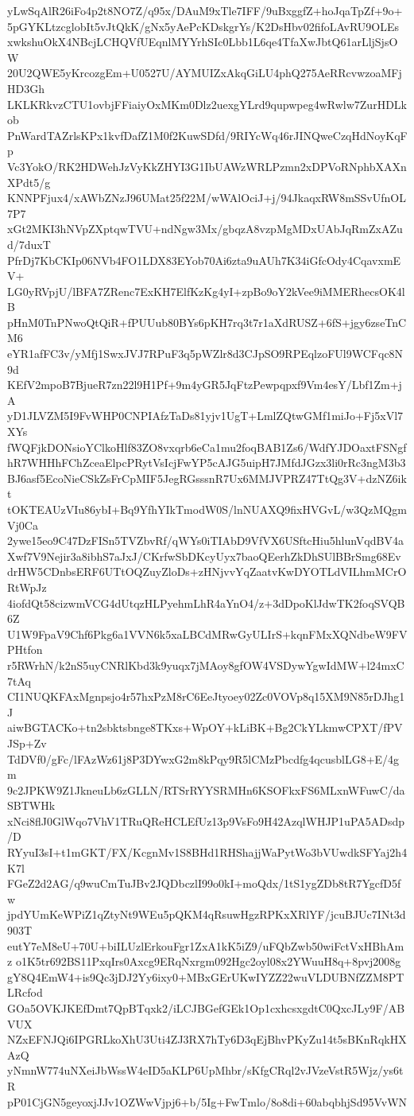 yLwSqAlR26iFo4p2t8NO7Z/q95x/DAuM9xTle7IFF/9uBxggfZ+hoJqaTpZf+9o+
5pGYKLtzcglobIt5vJtQkK/gNx5yAePcKDskgrYs/K2DsHbv02fifoLAvRU9OLEs
xwkshuOkX4NBcjLCHQVfUEqnlMYYrhSIc0Lbb1L6qe4TfaXwJbtQ61arLljSjsOW
20U2QWE5yKrcozgEm+U0527U/AYMUIZxAkqGiLU4phQ275AeRRcvwzoaMFjHD3Gh
LKLKRkvzCTU1ovbjFFiaiyOxMKm0Dlz2uexgYLrd9qupwpeg4wRwlw7ZurHDLkob
PnWardTAZrlsKPx1kvfDafZ1M0f2KuwSDfd/9RIYcWq46rJINQweCzqHdNoyKqFp
Vc3YokO/RK2HDWehJzVyKkZHYI3G1IbUAWzWRLPzmn2xDPVoRNphbXAXnXPdt5/g
KNNPFjux4/xAWbZNzJ96UMat25f22M/wWAlOciJ+j/94JkaqxRW8mSSvUfnOL7P7
xGt2MKI3hNVpZXptqwTVU+ndNgw3Mx/gbqzA8vzpMgMDxUAbJqRmZxAZud/7duxT
PfrDj7KbCKIp06NVb4FO1LDX83EYob70Ai6zta9uAUh7K34iGfcOdy4CqavxmEV+
LG0yRVpjU/lBFA7ZRenc7ExKH7ElfKzKg4yI+zpBo9oY2kVee9iMMERhecsOK4lB
pHnM0TnPNwoQtQiR+fPUUub80BYs6pKH7rq3t7r1aXdRUSZ+6fS+jgy6zseTnCM6
eYR1afFC3v/yMfj1SwxJVJ7RPuF3q5pWZlr8d3CJpSO9RPEqlzoFUl9WCFqc8N9d
KEfV2mpoB7BjueR7zn22l9H1Pf+9m4yGR5JqFtzPewpqpxf9Vm4esY/Lbf1Zm+jA
yD1JLVZM5I9FvWHP0CNPIAfzTaDs81yjv1UgT+LmlZQtwGMf1miJo+Fj5xVl7XYs
fWQFjkDONsioYClkoHlf83ZO8vxqrb6eCa1mu2foqBAB1Zs6/WdfYJDOaxtFSNgf
hR7WHHhFChZceaElpcPRytVsIcjFwYP5cAJG5uipH7JMfdJGzx3li0rRc3ngM3b3
BJ6asf5EcoNieCSkZsFrCpMIF5JegRGsssnR7Ux6MMJVPRZ47TtQg3V+dzNZ6ikt
tOKTEAUzVIu86ybI+Bq9YfhYIkTmodW0S/lnNUAXQ9fixHVGvL/w3QzMQgmVj0Ca
2ywe15eo9C47DzFISn5TVZbvRf/qWYs0iTIAbD9VfVX6USftcHiu5hlunVqdBV4a
Xwf7V9Nejir3a8ibhS7aJxJ/CKrfwSbDKcyUyx7baoQEerhZkDhSUlBBrSmg68Ev
drHW5CDnbsERF6UTtOQZuyZloDs+zHNjvvYqZaatvKwDYOTLdVILhmMCrORtWpJz
4iofdQt58cizwmVCG4dUtqzHLPyehmLhR4aYnO4/z+3dDpoKlJdwTK2foqSVQB6Z
U1W9FpaV9Chf6Pkg6a1VVN6k5xaLBCdMRwGyULIrS+kqnFMxXQNdbeW9FVPHtfon
r5RWrhN/k2nS5uyCNRlKbd3k9yuqx7jMAoy8gfOW4VSDywYgwIdMW+l24mxC7tAq
CI1NUQKFAxMgnpsjo4r57hxPzM8rC6EeJtyoey02Zc0VOVp8q15XM9N85rDJhg1J
aiwBGTACKo+tn2sbktsbnge8TKxs+WpOY+kLiBK+Bg2CkYLkmwCPXT/fPVJSp+Zv
TdDVf0/gFc/lFAzWz61j8P3DYwxG2m8kPqy9R5lCMzPbcdfg4qcusblLG8+E/4gm
9c2JPKW9Z1JkneuLb6zGLLN/RTSrRYYSRMHn6KSOFkxFS6MLxnWFuwC/daSBTWHk
xNci8flJ0GlWqo7VhV1TRuQReHCLEfUz13p9VsFo9H42AzqlWHJP1uPA5ADsdp/D
RYyuI3sI+t1mGKT/FX/KcgnMv1S8BHd1RHShajjWaPytWo3bVUwdkSFYaj2h4K7l
FGeZ2d2AG/q9wuCmTuJBv2JQDbczlI99o0kI+moQdx/1tS1ygZDb8tR7YgcfD5fw
jpdYUmKeWPiZ1qZtyNt9WEu5pQKM4qRsuwHgzRPKxXRlYF/jcuBJUc7INt3d903T
eutY7eM8eU+70U+biILUzlErkouFgr1ZxA1kK5iZ9/uFQbZwb50wiFctVxHBhAmz
o1K5tr692BS11PxqIrs0Axcg9ERqNxrgm092Hgc2oyl08x2YWuuH8q+8pvj2008g
gY8Q4EmW4+is9Qc3jDJ2Yy6ixy0+MBxGErUKwIYZZ22wuVLDUBNfZZM8PTLRcfod
GOa5OVKJKEfDmt7QpBTqxk2/iLCJBGefGEk1Op1cxhcsxgdtC0QxcJLy9F/ABVUX
NZxEFNJQi6IPGRLkoXhU3Uti4ZJ3RX7hTy6D3qEjBhvPKyZu14t5sBKnRqkHXAzQ
yNmnW774uNXeiJbWssW4eID5aKLP6UpMhbr/sKfgCRql2vJVzeVstR5Wjz/ys6tR
pP01CjGN5geyoxjJJv1OZWwVjpj6+b/5Ig+FwTmlo/8o8di+60abqbhjSd95VvWN
